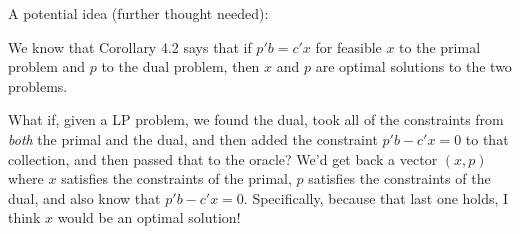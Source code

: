 A potential idea (further thought needed):

We know that Corollary 4.2 says that if $p'b=c'x$ for feasible $x$ to the primal problem and $p$ to the dual problem, then $x$ and $p$ are optimal solutions to the two problems.

What if, given a LP problem, we found the dual, took all of the constraints from \textit{both} the primal and the dual, and then added the constraint $p'b-c'x=0$ to that collection, and then passed that to the oracle? We'd get back a vector $(x,p)$ where $x$ satisfies the constraints of the primal, $p$ satisfies the constraints of the dual, and also know that $p'b-c'x=0$. Specifically, because that last one holds, I think $x$ would be an optimal solution!